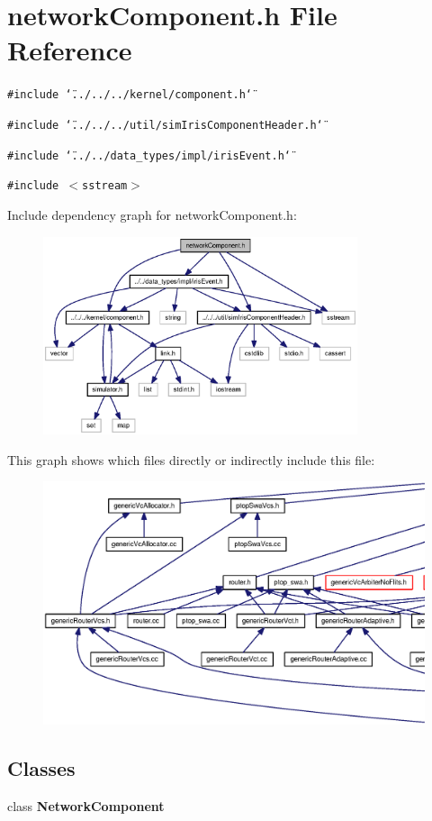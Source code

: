 \section{networkComponent.h File Reference}
\label{networkComponent_8h}
{\tt \#include \char`\"{}../../../kernel/component.h\char`\"{}}\par
{\tt \#include \char`\"{}../../../util/simIrisComponentHeader.h\char`\"{}}\par
{\tt \#include \char`\"{}../../data\_\-types/impl/irisEvent.h\char`\"{}}\par
{\tt \#include $<$sstream$>$}\par


Include dependency graph for networkComponent.h:\nopagebreak
\begin{figure}[H]
\begin{center}
\leavevmode
\includegraphics[width=262pt]{networkComponent_8h__incl}
\end{center}
\end{figure}


This graph shows which files directly or indirectly include this file:\nopagebreak
\begin{figure}[H]
\begin{center}
\leavevmode
\includegraphics[width=420pt]{networkComponent_8h__dep__incl}
\end{center}
\end{figure}
\subsection*{Classes}
\begin{CompactItemize}
\item 
class {\bf NetworkComponent}
\end{CompactItemize}
